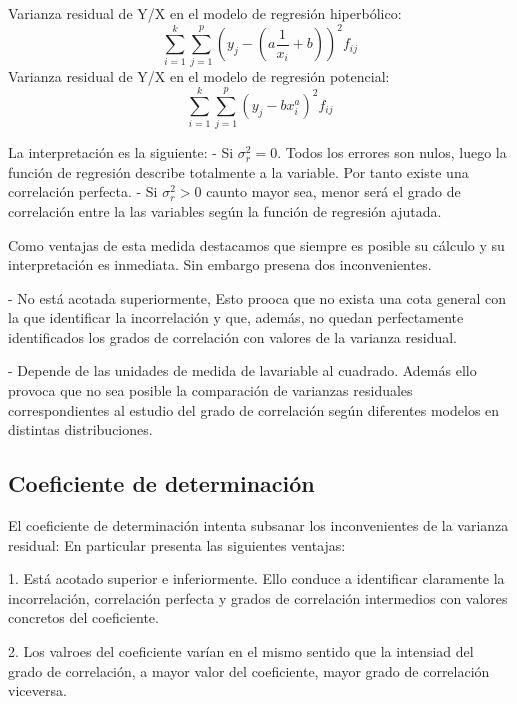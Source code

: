 \documentclass{article}
\begin{document}
Varianza residual de Y/X en el modelo de regresión hiperbólico:
$$ \sum_{i=1}^k \sum_{j=1}^p ( y_j - (a\frac{1}{x_i} +b) )^2 f_{ij} $$
Varianza residual de Y/X en el modelo de regresión potencial:
$$\sum_{i=1}^k \sum_{j=1}^p ( y_j - bx_i^a )^2 f_{ij} $$

La interpretación es la siguiente: 
- Si $\sigma_r^2 = 0$. Todos los errores son nulos, luego la función de regresión describe totalmente a la variable. Por tanto existe una correlación perfecta.
- Si $\sigma_r^2 > 0$ caunto mayor sea, menor será el grado de correlación entre la las variables según la función de regresión ajutada.

\vspace{2mm}

Como ventajas de esta medida destacamos que siempre es posible su cálculo y su interpretación es inmediata. Sin embargo presena dos inconvenientes.

\vspace{2mm}

- No está acotada superiormente, Esto prooca que no exista una cota general con la que identificar la incorrelación y que, además, no quedan perfectamente identificados los grados de correlación con valores de la varianza residual. 

\vspace{2mm}

- Depende de las unidades de medida de lavariable al cuadrado. Además ello provoca que no sea posible la comparación de varianzas residuales correspondientes al estudio del grado de correlación según diferentes modelos en distintas distribuciones.

\subsection{Coeficiente de determinación}

	El coeficiente de determinación intenta subsanar los inconvenientes de la varianza residual: En particular presenta las siguientes ventajas:
	\vspace{2mm}
	
	1. Está acotado superior e inferiormente. Ello conduce a identificar claramente la incorrelación, correlación perfecta y grados de correlación intermedios con valores concretos del coeficiente.
	
	\vspace{2mm}
	
	2. Los valroes del coeficiente varían en el mismo sentido que la intensiad del grado de correlación, a mayor valor del coeficiente, mayor grado de correlación viceversa.
	
\end{document}
